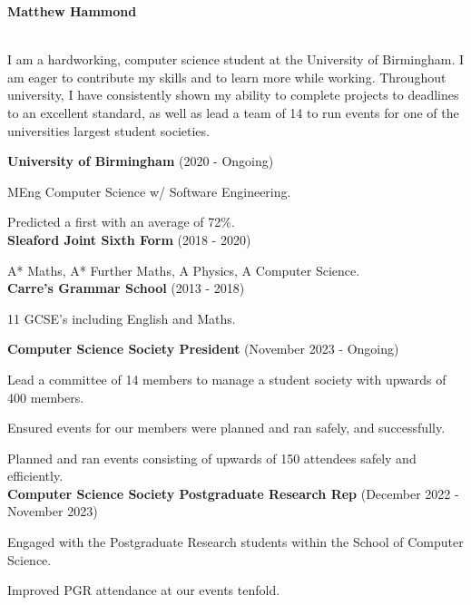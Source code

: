 \documentclass[twoside]{article}
\begin{document}
\begin{center}
    \noindent\huge\textbf{Matthew Hammond}
\end{center}\hr
{}
\hfill
{}\\
\hfill
{}\hr
I am a hardworking, computer science student at the University of Birmingham. I am eager to contribute my skills and to learn more while working. Throughout university, I have consistently shown my ability to complete projects to deadlines to an excellent standard, as well as lead a team of 14 to run events for one of the universities largest student societies.

\textbf{University of Birmingham} (2020 - Ongoing)\par
MEng Computer Science w/ Software Engineering.\par
Predicted a first with an average of 72\%.\\
\textbf{Sleaford Joint Sixth Form} (2018 - 2020)\par
A* Maths, A* Further Maths, A Physics, A Computer Science.\\
\textbf{Carre’s Grammar School} (2013 - 2018)\par
11 GCSE's including English and Maths.

\textbf{Computer Science Society President} (November 2023 - Ongoing)\par
Lead a committee of 14 members to manage a student society with upwards of 400 members.\par
Ensured events for our members were planned and ran safely, and successfully.\par
Planned and ran events consisting of upwards of 150 attendees safely and efficiently.\\
\textbf{Computer Science Society Postgraduate Research Rep} (December 2022 - November 2023)\par
Engaged with the Postgraduate Research students within the School of Computer Science.\par
Improved PGR attendance at our events tenfold.
\\
\end{document}
